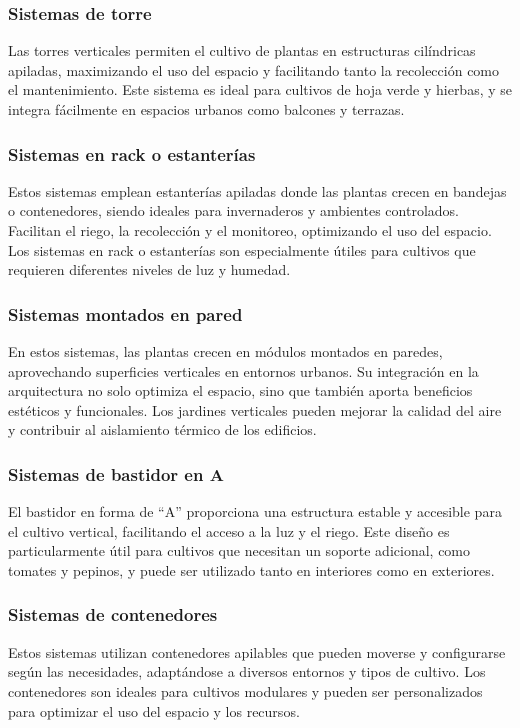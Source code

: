 \subsubsection{Sistemas de torre}
Las torres verticales permiten el cultivo de plantas en estructuras cilíndricas apiladas, maximizando el uso del espacio y facilitando tanto la recolección como el mantenimiento.
Este sistema es ideal para cultivos de hoja verde y hierbas, y se integra fácilmente en espacios urbanos como balcones y terrazas.

\subsubsection{Sistemas en rack o estanterías}
Estos sistemas emplean estanterías apiladas donde las plantas crecen en bandejas o contenedores, siendo ideales para invernaderos y ambientes controlados. Facilitan el riego, la recolección y el monitoreo, optimizando el uso del espacio.
Los sistemas en rack o estanterías son especialmente útiles para cultivos que requieren diferentes niveles de luz y humedad.

\subsubsection{Sistemas montados en pared}
En estos sistemas, las plantas crecen en módulos montados en paredes, aprovechando superficies verticales en entornos urbanos. Su integración en la arquitectura no solo optimiza el espacio, sino que también aporta beneficios estéticos y funcionales.
Los jardines verticales pueden mejorar la calidad del aire y contribuir al aislamiento térmico de los edificios.

\subsubsection{Sistemas de bastidor en A}
El bastidor en forma de “A” proporciona una estructura estable y accesible para el cultivo vertical, facilitando el acceso a la luz y el riego.
Este diseño es particularmente útil para cultivos que necesitan un soporte adicional, como tomates y pepinos, y puede ser utilizado tanto en interiores como en exteriores.

\subsubsection{Sistemas de contenedores}
Estos sistemas utilizan contenedores apilables que pueden moverse y configurarse según las necesidades, adaptándose a diversos entornos y tipos de cultivo.
Los contenedores son ideales para cultivos modulares y pueden ser personalizados para optimizar el uso del espacio y los recursos.


